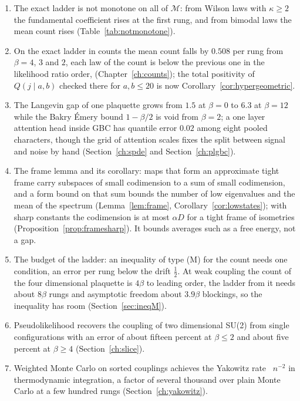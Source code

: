 \begin{enumerate}
\item The exact ladder is not monotone on all of $\mathcal M$: from Wilson laws with $\kappa\ge2$ the fundamental coefficient rises at the first rung, and from bimodal laws the mean count rises (Table~\ref{tab:notmonotone}).
\item On the exact ladder in counts the mean count falls by $0.508$ per rung from $\beta=4$, $3$ and $2$, each law of the count is below the previous one in the likelihood ratio order, (Chapter~\ref{ch:counts}); the total positivity of $Q(j\mid a,b)$ checked there for $a,b\le20$ is now Corollary~\ref{cor:hypergeometric}.
\item The Langevin gap of one plaquette grows from $1.5$ at $\beta=0$ to $6.3$ at $\beta=12$ while the Bakry \'Emery bound $1-\beta/2$ is void from $\beta=2$; a one layer attention head inside GBC has quantile error $0.02$ among eight pooled characters, though the grid of attention scales fixes the split between signal and noise by hand (Section~\ref{ch:spde} and Section~\ref{ch:plgbc}).
\item The frame lemma and its corollary: maps that form an approximate tight frame carry subspaces of small codimension to a sum of small codimension, and a form bound on that sum bounds the number of low eigenvalues and the mean of the spectrum (Lemma~\ref{lem:frame}, Corollary~\ref{cor:lowstates}); with sharp constants the codimension is at most $\alpha D$ for a tight frame of isometries (Proposition~\ref{prop:framesharp}). It bounds averages such as a free energy, not a gap.
\item The budget of the ladder: an inequality of type (M) for the count needs one condition, an error per rung below the drift $\frac12$. At weak coupling the count of the four dimensional plaquette is $4\beta$ to leading order, the ladder from it needs about $8\beta$ rungs and asymptotic freedom about $3.9\beta$ blockings, so the inequality has room (Section~\ref{sec:ineqM}).
\item Pseudolikelihood recovers the coupling of two dimensional SU(2) from single configurations with an error of about fifteen percent at $\beta\le2$ and about five percent at $\beta\ge4$ (Section~\ref{ch:slice}).
\item Weighted Monte Carlo on sorted couplings achieves the Yakowitz rate~\cite{Ya78} $n^{-2}$ in thermodynamic integration, a factor of several thousand over plain Monte Carlo at a few hundred rungs (Section~\ref{ch:yakowitz}).
\end{enumerate}

